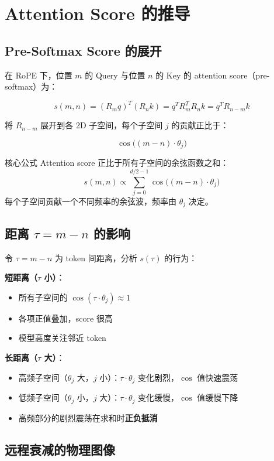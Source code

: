 \section{Attention Score 的推导}

\subsection{Pre-Softmax Score 的展开}

在 RoPE 下，位置 $m$ 的 Query 与位置 $n$ 的 Key 的 attention score（pre-softmax）为：

$$
s(m,n) = (R_m q)^T (R_n k) = q^T R_m^T R_n k = q^T R_{n-m} k
$$

将 $R_{n-m}$ 展开到各 2D 子空间，每个子空间 $j$ 的贡献正比于：

$$
\cos\big((m-n) \cdot \theta_j\big)
$$

\begin{importantbox}{核心公式}
Attention score 正比于所有子空间的余弦函数之和：
$$
s(m,n) \propto \sum_{j=0}^{d/2-1} \cos\big((m-n) \cdot \theta_j\big)
$$
每个子空间贡献一个不同频率的余弦波，频率由 $\theta_j$ 决定。
\end{importantbox}

\subsection{距离 $\tau = m - n$ 的影响}

令 $\tau = m - n$ 为 token 间距离，分析 $s(\tau)$ 的行为：

\textbf{短距离（$\tau$ 小）}：
\begin{itemize}
  \item 所有子空间的 $\cos(\tau \cdot \theta_j) \approx 1$
  \item 各项正值叠加，score 很高
  \item 模型高度关注邻近 token
\end{itemize}

\textbf{长距离（$\tau$ 大）}：
\begin{itemize}
  \item 高频子空间（$\theta_j$ 大，$j$ 小）：$\tau \cdot \theta_j$ 变化剧烈，$\cos$ 值快速震荡
  \item 低频子空间（$\theta_j$ 小，$j$ 大）：$\tau \cdot \theta_j$ 变化缓慢，$\cos$ 值缓慢下降
  \item 高频部分的剧烈震荡在求和时\textbf{正负抵消}
\end{itemize}

\subsection{远程衰减的物理图像}

